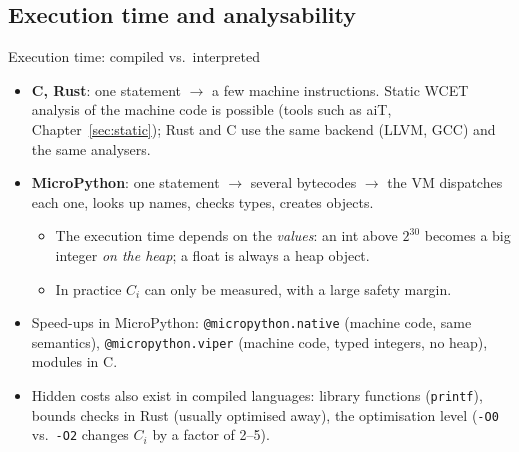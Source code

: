 \subsection{Execution time and analysability}
\begin{frame}{Execution time: compiled vs.\ interpreted}
  \begin{itemize}
    \item \textbf{C, Rust}: one statement $\rightarrow$ a few machine instructions. Static WCET analysis of the machine code is possible (tools such as aiT, Chapter~\ref{sec:static}); Rust and C use the same backend (LLVM, GCC) and the same analysers.
    \item \textbf{MicroPython}: one statement $\rightarrow$ several bytecodes $\rightarrow$ the VM dispatches each one, looks up names, checks types, creates objects.
    \begin{itemize}
      \item The execution time depends on the \emph{values}: an int above $2^{30}$ becomes a big integer \emph{on the heap}; a float is always a heap object.
      \item In practice $C_i$ can only be measured, with a large safety margin.
    \end{itemize}
    \item Speed-ups in MicroPython: \texttt{@micropython.native} (machine code, same semantics), \texttt{@micropython.viper} (machine code, typed integers, no heap), modules in C.
    \item Hidden costs also exist in compiled languages: library functions (\texttt{printf}), bounds checks in Rust (usually optimised away), the optimisation level (\texttt{-O0} vs.\ \texttt{-O2} changes $C_i$ by a factor of 2--5).
  \end{itemize}
\end{frame}


